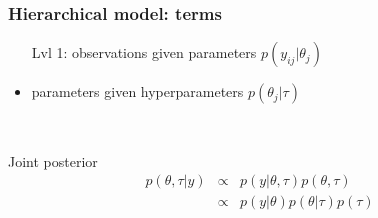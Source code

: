 \documentclass[10pt]{beamer}
\begin{document}
\begin{frame}[fragile]

\frametitle{Hierarchical model: terms}

\begin{overlayarea}{8cm}{4cm}
  \begin{itemize}
  \item[Lvl 1:] observations given parameters $p(y_{ij}|\theta_j)$
  \item<2->[Lvl 2:] parameters given hyperparameters
    $p(\theta_j|\tau)$
  \end{itemize}
  \begin{minipage}[b]{3cm}
  \scriptsize
    \begin{xy}
    \end{xy}
  \end{minipage}\\
\end{overlayarea}
\vspace{1cm}
  Joint posterior
  \begin{eqnarray*}
    p(\theta,\tau|y) & \propto & p(y|\theta,\tau) p(\theta,\tau) \\
    & \propto & p(y|\theta) p(\theta|\tau) p(\tau)
  \end{eqnarray*}
\end{frame}
\end{document}
